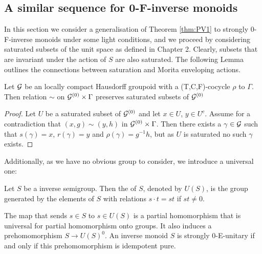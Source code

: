 \begin{corollary}
\section{A similar sequence for 0-F-inverse monoids}\label{sect:S2}
In this section we consider a generalisation of Theorem \ref{thm:PV1} to strongly 0-F-inverse monoids under some light conditions, and we proceed by considering saturated subsets of the unit space as defined in Chapter 2. Clearly, subsets that are invariant under the action of $S$ are also saturated. The following Lemma outlines the connections between saturation and Morita enveloping actions.

\begin{lemma}\label{Lem:Cut}
Let $\mathcal{G}$ be an \etale locally compact Hausdorff groupoid with a (T,C,F)-cocycle $\rho$ to $\Gamma$. Then relation $\sim$ on $\mathcal{G}^{(0)} \times \Gamma$ preserves saturated subsets of $\mathcal{G}^{(0)}$
\end{lemma}
\begin{proof}
Let $U$ be a saturated subset of $\mathcal{G}^{(0)}$ and let $x \in U$, $y \in U^{c}$. Assume for a contradiction that $(x,g) \sim (y,h)$ in $\mathcal{G}^{(0)} \times \Gamma$. Then there exists a $\gamma$ $\in \mathcal{G}$ such that $s(\gamma)=x$, $r(\gamma)=y$ and $\rho(\gamma)=g^{-1}h$, but as $U$ is saturated no such $\gamma$ exists. 
\end{proof}

Additionally, as we have no obvious group to consider, we introduce a universal one:

\begin{definition}
Let $S$ be a inverse semigroup. Then the  of $S$, denoted by $U(S)$, is the group generated by the elements of $S$ with relations $s\cdot t = st$ if $st \not \equal 0$.
\end{definition}

The map that sends $s \in S$ to $s \in U(S)$ is a partial homomorphism that is universal for partial homomorphism onto groups. It also induces a prehomomorphism $S \rightarrow U(S)^{0}$. An inverse monoid $S$ is strongly $0$-E-unitary if and only if this prehomomorphism is idempotent pure.


\end{corollary}
